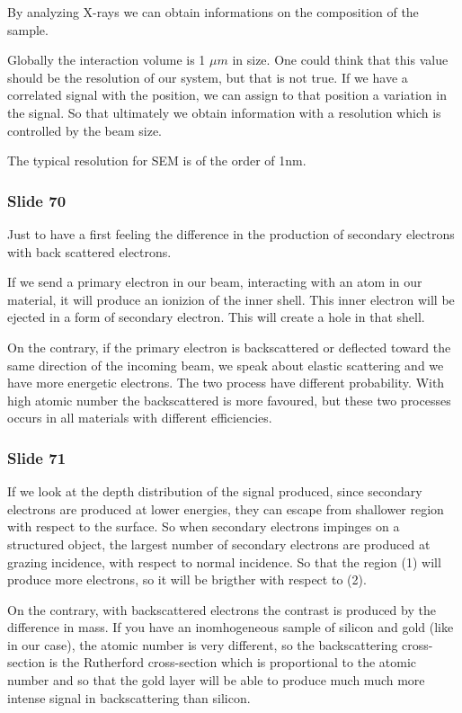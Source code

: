 \documentclass[../main/main.tex]{subfiles}
\begin{document}
By analyzing X-rays we can obtain informations on the composition of the sample.

Globally the interaction volume is 1 \( \mu m  \) in size.
One could think that this value should be the resolution of our system, but that is not true. If we have a correlated signal with the position, we can assign to that position a variation in the signal. So that ultimately we obtain information with a resolution which is controlled by the beam size.

The typical resolution for SEM is of the order of 1nm.

\subsubsection{Slide 70}
Just to have a first feeling the difference in the production of secondary electrons with back scattered electrons.

If we send a primary electron in our beam, interacting with an atom in our material, it will produce an ionizion of the inner shell. This inner electron will be ejected in a form of secondary electron.
This will create a hole in that shell.

On the contrary, if the primary electron is backscattered or deflected toward the same direction of the incoming beam, we speak about elastic scattering and we have more energetic electrons. The two process have different probability. With high atomic number the backscattered is more favoured, but these two processes occurs in all materials with different efficiencies.

\subsubsection{Slide 71}
If we look at the depth distribution of the signal produced, since secondary electrons are produced at lower energies, they can escape from shallower region with respect to the surface. So when secondary electrons impinges on a structured object, the largest number of secondary electrons are produced at grazing incidence, with respect to normal incidence. So that the region (1) will produce more electrons, so it will be brigther with respect to (2).

On the contrary, with backscattered electrons the contrast is produced by the difference in mass. If you have an inomhogeneous sample of silicon and gold (like in our case), the atomic number is very different, so the backscattering cross-section is the Rutherford cross-section which is proportional to the atomic number and so that the gold layer will be able to produce much much more intense signal in backscattering than silicon.
\end{document}

